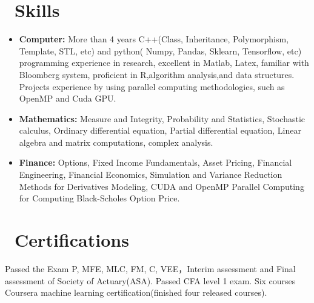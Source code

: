 \documentclass{resume}
\begin{document}
\section{\faWrench
\ Skills}
\begin{itemize}[parsep=0.5ex]\large
  \item \textbf{Computer:} More than 4 years C++(Class,  Inheritance,  Polymorphism,  Template,  STL,  etc) and python( Numpy,  Pandas, 
  Sklearn,  Tensorflow,  etc) programming experience in research,   excellent in Matlab,  Latex,  familiar with Bloomberg system, proficient in R,algorithm analysis,and data structures. Projects experience by using parallel computing methodologies,  such as OpenMP and Cuda GPU.
  
  \item \textbf{Mathematics:}
   Measure and Integrity,  Probability and Statistics,  Stochastic calculus, Ordinary differential equation,
  Partial differential equation,  Linear algebra and matrix computations,  complex analysis.
  
  \item \textbf{Finance:} Options,  Fixed Income Fundamentals,  Asset Pricing,  Financial Engineering, Financial Economics, 
  Simulation and Variance Reduction Methods for Derivatives Modeling,   CUDA and OpenMP Parallel Computing for Computing Black-Scholes Option Price.
  
\end{itemize}

\section{\faBook\ Certifications}\large 
Passed the Exam P,  MFE,  MLC,  FM,  C,  VEE，Interim assessment and Final assessment of Society of Actuary(ASA). Passed CFA level 1 exam. Six courses Coursera machine learning certification(finished four released courses).

%
%
\end{document}
